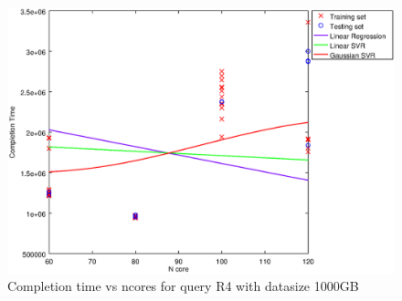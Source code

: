 
\begin {figure}[hbtp]
\centering
\includegraphics[width=\textwidth]{output/R4_1000_LINEAR_NCORE/plot_R4_1000_bestmodels.eps}
\caption{Completion time vs ncores for query R4 with datasize 1000GB}
\label{fig:coreonly_linear_R4_1000}
\end {figure}
